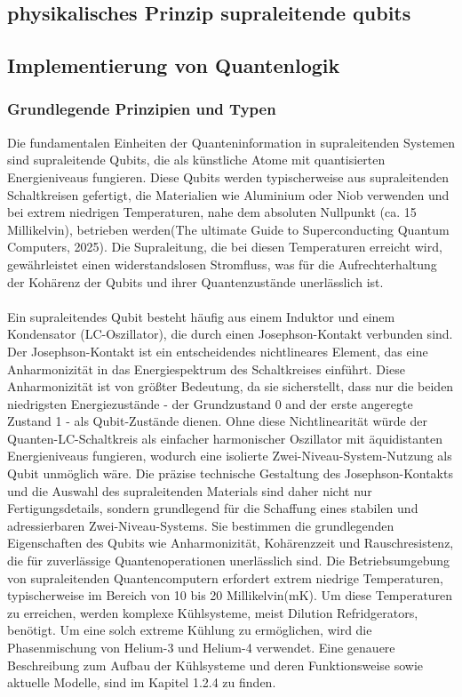 \subsection{physikalisches Prinzip supraleitende qubits}
\subsection{Implementierung von Quantenlogik}
\subsubsection{Grundlegende Prinzipien und Typen}
Die fundamentalen Einheiten der Quanteninformation in supraleitenden Systemen sind supraleitende Qubits, die als künstliche Atome mit quantisierten Energieniveaus fungieren. Diese Qubits werden typischerweise aus supraleitenden Schaltkreisen gefertigt, die Materialien wie Aluminium oder Niob verwenden und bei extrem niedrigen Temperaturen, nahe dem absoluten Nullpunkt (ca. 15 Millikelvin), betrieben werden(The ultimate Guide to Superconducting Quantum Computers, 2025). Die Supraleitung, die bei diesen Temperaturen erreicht wird, gewährleistet einen widerstandslosen Stromfluss, was für die Aufrechterhaltung der Kohärenz der Qubits und ihrer Quantenzustände unerlässlich ist.
\\\\
Ein supraleitendes Qubit besteht häufig aus einem Induktor und einem Kondensator (LC-Oszillator), die durch einen Josephson-Kontakt verbunden sind. Der Josephson-Kontakt ist ein entscheidendes nichtlineares Element, das eine Anharmonizität in das Energiespektrum des Schaltkreises einführt. Diese Anharmonizität ist von größter Bedeutung, da sie sicherstellt, dass nur die beiden niedrigsten Energiezustände - der Grundzustand 0 and der erste angeregte Zustand 1 - als Qubit-Zustände dienen. Ohne diese Nichtlinearität würde der Quanten-LC-Schaltkreis als einfacher harmonischer Oszillator mit äquidistanten Energieniveaus fungieren, wodurch eine isolierte Zwei-Niveau-System-Nutzung als Qubit unmöglich wäre. Die präzise technische Gestaltung des Josephson-Kontakts und die Auswahl des supraleitenden Materials sind daher nicht nur Fertigungsdetails, sondern grundlegend für die Schaffung eines stabilen und adressierbaren Zwei-Niveau-Systems. Sie bestimmen die grundlegenden Eigenschaften des Qubits wie Anharmonizität, Kohärenzzeit und Rauschresistenz, die für zuverlässige Quantenoperationen unerlässlich sind. Die Betriebsumgebung von supraleitenden Quantencomputern erfordert extrem niedrige Temperaturen, typischerweise im Bereich von 10 bis 20 Millikelvin(mK). Um diese Temperaturen zu erreichen, werden komplexe Kühlsysteme, meist Dilution Refridgerators, benötigt. Um eine solch extreme Kühlung zu ermöglichen, wird die Phasenmischung von Helium-3 und Helium-4 verwendet. Eine genauere Beschreibung zum Aufbau der Kühlsysteme und deren Funktionsweise sowie aktuelle Modelle, sind im Kapitel 1.2.4 zu finden.
